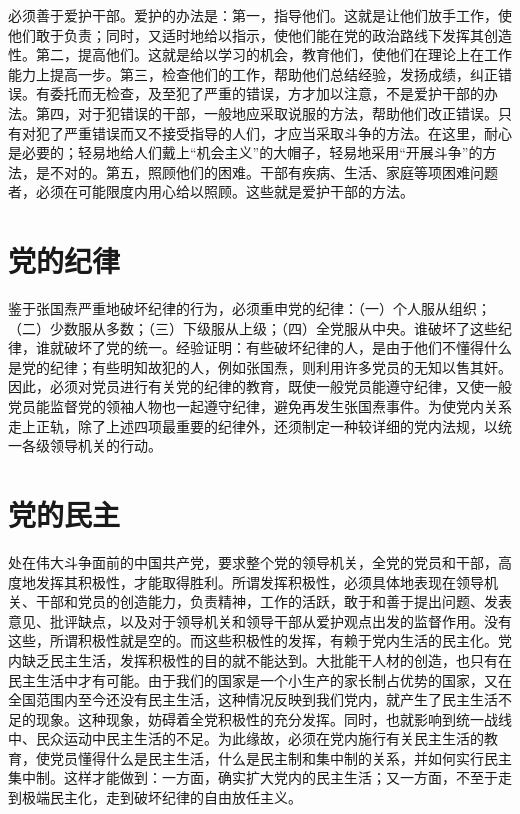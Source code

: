 必须善于爱护干部。爱护的办法是：第一，指导他们。这就是让他们放手工作，使他们敢于负责；同时，又适时地给以指示，使他们能在党的政治路线下发挥其创造性。第二，提高他们。这就是给以学习的机会，教育他们，使他们在理论上在工作能力上提高一步。第三，检查他们的工作，帮助他们总结经验，发扬成绩，纠正错误。有委托而无检查，及至犯了严重的错误，方才加以注意，不是爱护干部的办法。第四，对于犯错误的干部，一般地应采取说服的方法，帮助他们改正错误。只有对犯了严重错误而又不接受指导的人们，才应当采取斗争的方法。在这里，耐心是必要的；轻易地给人们戴上“机会主义”的大帽子，轻易地采用“开展斗争”的方法，是不对的。第五，照顾他们的困难。干部有疾病、生活、家庭等项困难问题者，必须在可能限度内用心给以照顾。这些就是爱护干部的方法。

\section{党的纪律}

鉴于张国焘严重地破坏纪律的行为，必须重申党的纪律：（一）个人服从组织；（二）少数服从多数；（三）下级服从上级；（四）全党服从中央。谁破坏了这些纪律，谁就破坏了党的统一。经验证明：有些破坏纪律的人，是由于他们不懂得什么是党的纪律；有些明知故犯的人，例如张国焘，则利用许多党员的无知以售其奸。因此，必须对党员进行有关党的纪律的教育，既使一般党员能遵守纪律，又使一般党员能监督党的领袖人物也一起遵守纪律，避免再发生张国焘事件。为使党内关系走上正轨，除了上述四项最重要的纪律外，还须制定一种较详细的党内法规，以统一各级领导机关的行动。

\section{党的民主}

处在伟大斗争面前的中国共产党，要求整个党的领导机关，全党的党员和干部，高度地发挥其积极性，才能取得胜利。所谓发挥积极性，必须具体地表现在领导机关、干部和党员的创造能力，负责精神，工作的活跃，敢于和善于提出问题、发表意见、批评缺点，以及对于领导机关和领导干部从爱护观点出发的监督作用。没有这些，所谓积极性就是空的。而这些积极性的发挥，有赖于党内生活的民主化。党内缺乏民主生活，发挥积极性的目的就不能达到。大批能干人材的创造，也只有在民主生活中才有可能。由于我们的国家是一个小生产的家长制占优势的国家，又在全国范围内至今还没有民主生活，这种情况反映到我们党内，就产生了民主生活不足的现象。这种现象，妨碍着全党积极性的充分发挥。同时，也就影响到统一战线中、民众运动中民主生活的不足。为此缘故，必须在党内施行有关民主生活的教育，使党员懂得什么是民主生活，什么是民主制和集中制的关系，并如何实行民主集中制。这样才能做到：一方面，确实扩大党内的民主生活；又一方面，不至于走到极端民主化，走到破坏纪律的自由放任主义。


